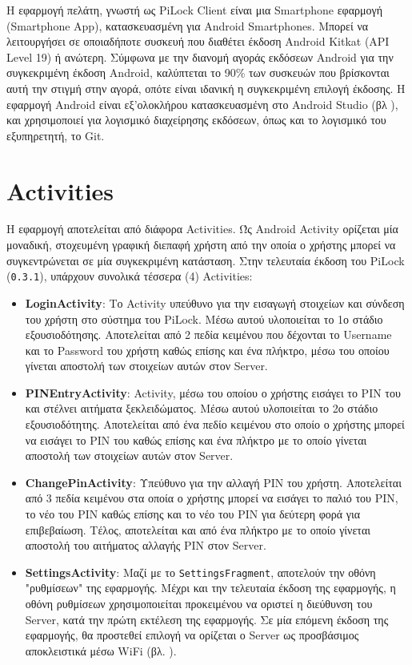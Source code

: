 Η εφαρμογή πελάτη, γνωστή ως PiLock Client είναι μια Smartphone εφαρμογή (Smartphone App), κατασκευασμένη για Android Smartphones. Μπορεί να λειτουργήσει σε οποιαδήποτε συσκευή που διαθέτει έκδοση Android Kitkat (API Level 19) ή ανώτερη. Σύμφωνα με την διανομή αγοράς εκδόσεων Android για την συγκεκριμένη έκδοση Android, καλύπτεται το 90\% των συσκευών που βρίσκονται αυτή την στιγμή στην αγορά, οπότε είναι ιδανική η συγκεκριμένη επιλογή έκδοσης. Η εφαρμογή Android είναι εξ'ολοκλήρου κατασκευασμένη στο Android Studio (βλ ), και χρησιμοποιεί για λογισμικό διαχείρησης εκδόσεων, όπως και το λογισμικό του εξυπηρετητή, το Git.

\section{Activities}
	Η εφαρμογή αποτελείται από διάφορα Activities. Ώς Android Activity ορίζεται μία μοναδική, στοχευμένη γραφική διεπαφή χρήστη από την οποία ο χρήστης μπορεί να συγκεντρώνεται σε μία συγκεκριμένη κατάσταση. Στην τελευταία έκδοση του PiLock (\verb|0.3.1|), υπάρχουν συνολικά τέσσερα (4) Activities:

	\begin{itemize}
		\item \textbf{LoginActivity}: Το Activity υπεύθυνο για την εισαγωγή στοιχείων και σύνδεση του χρήστη στο σύστημα του PiLock. Μέσω αυτού υλοποιείται το 1ο στάδιο εξουσιοδότησης. Αποτελείται από 2 πεδία κειμένου που δέχονται το Username και το Password του χρήστη καθώς επίσης και ένα πλήκτρο, μέσω του οποίου γίνεται αποστολή των στοιχείων αυτών στον Server.
		\item \textbf{PINEntryActivity}: Activity, μέσω του οποίου ο χρήστης εισάγει το PIN του και στέλνει αιτήματα ξεκλειδώματος. Μέσω αυτού υλοποιείται το 2ο στάδιο εξουσιοδότητης. Αποτελείται από ένα πεδίο κειμένου στο οποίο ο χρήστης μπορεί να εισάγει το PIN του καθώς επίσης και ένα πλήκτρο με το οποίο γίνεται αποστολή των στοιχείων αυτών στον Server.
		\item \textbf{ChangePinActivity}: Υπεύθυνο για την αλλαγή PIN του χρήστη. Αποτελείται από 3 πεδία κειμένου στα οποία ο χρήστης μπορεί να εισάγει το παλιό του PIN, το νέο του PIN καθώς επίσης και το νέο του PIN για δεύτερη φορά για επιβεβαίωση. Τέλος, αποτελείται και από ένα πλήκτρο με το οποίο γίνεται αποστολή του αιτήματος αλλαγής PIN στον Server.
		\item \textbf{SettingsActivity}: Μαζί με το \verb|SettingsFragment|, αποτελούν την οθόνη "ρυθμίσεων" της εφαρμογής. Μέχρι και την τελευταία έκδοση της εφαρμογής, η οθόνη ρυθμίσεων χρησιμοποιείται προκειμένου να οριστεί η διεύθυνση του Server, κατά την πρώτη εκτέλεση της εφαρμογής. Σε μία επόμενη έκδοση της εφαρμογής, θα προστεθεί επιλογή να ορίζεται ο Server ως προσβάσιμος αποκλειστικά μέσω WiFi (βλ. ).
	\end{itemize}

